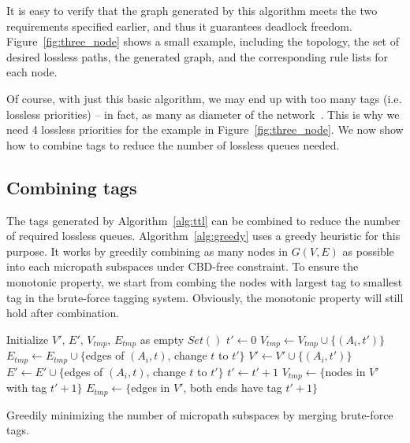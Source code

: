 It is easy to verify that the graph generated by this algorithm meets the two
requirements specified earlier, and thus it guarantees deadlock freedom.
Figure~\ref{fig:three_node} shows a small example, including the topology, the
set of desired lossless paths, the generated graph, and the corresponding rule
lists for each node.  

Of course, with just this basic algorithm, we may end up with too many tags
(i.e. lossless priorities) -- in fact, as many as diameter of the
network~\cite{xxx}. This is why we need 4 lossless priorities for the example in
Figure~\ref{fig:three_node}.  We now show how to combine tags to reduce the
number of lossless queues needed.

\subsection{Combining tags} 

The tags generated by Algorithm~\ref{alg:ttl} can be combined to reduce the
number of required lossless queues.  Algorithm~\ref{alg:greedy} uses a greedy
heuristic for this purpose.  It works by greedily combining as many nodes in
$G(V,E)$ as possible into each micropath subspaces under CBD-free constraint. To
ensure the monotonic property, we start from combing the nodes with largest tag
to smallest tag in the brute-force tagging system.  Obviously, the monotonic
property will still hold after combination. 

\begin{algorithm}[t]
	\small
	Initialize $V'$, $E'$, $V_{tmp}$, $E_{tmp}$ as empty $Set()$\;
	$t' \gets 0$\;
	 {
		 {
			$V_{tmp} \gets V_{tmp} \cup \{(A_i, t')\}$\;
			$E_{tmp} \gets E_{tmp} \cup \{$edges of $(A_i, t)$, change $t$ to $t'\}$\;
			 {
				$V' \gets V' \cup \{(A_i, t')\}$\;
				$E' \gets E' \cup \{$edges of $(A_i, t)$, change $t$ to $t'\}$\; 
			}
		}
		 {
			$t' \gets t'+1$\;
			$V_{tmp} \gets \{$nodes in $V'$ with tag $t'+1\}$\;
			$E_{tmp} \gets \{$edges in $V'$, both ends have tag $t'+1\}$\;
		}
	}
	\;
    \caption{Greedily minimizing the number of micropath subspaces by merging brute-force tags.}
	\label{alg:greedy}
\end{algorithm}

